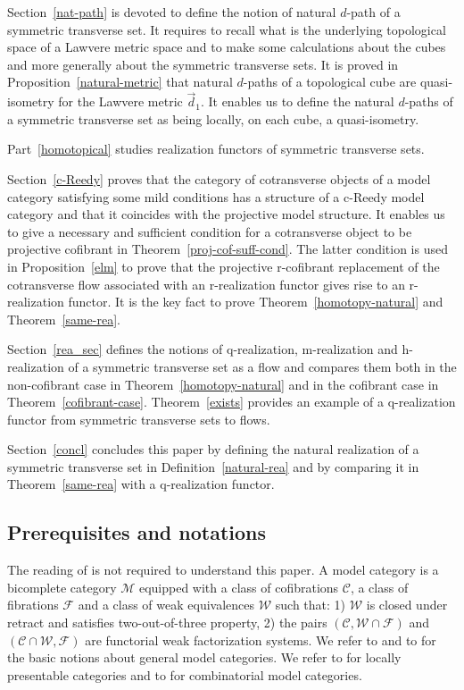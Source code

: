 \documentclass[a4paper,12pt]{amsart}
\newcommand{\C}{\mathcal{C}}
\newcommand{\W}{\mathcal{W}}
\newcommand{\F}{\mathcal{F}}
\renewcommand{\vec}{\overrightarrow}
\theoremstyle{definition}
\newcommand{\ttt}{two-out-of-three property}
\newcommand{\vd}{\vec{d}\!_1}
\begin{document}
Section~\ref{nat-path} is devoted to define the notion of natural $d$-path of a symmetric transverse set. It requires to recall what is the underlying topological space of a Lawvere metric space and to make some calculations about the cubes and more generally about the symmetric transverse sets. It is proved in Proposition~\ref{natural-metric} that natural $d$-paths of a topological cube are quasi-isometry for the Lawvere metric $\vd$. It enables us to define the natural $d$-paths of a symmetric transverse set as being locally, on each cube, a quasi-isometry. 

Part~\ref{homotopical} studies realization functors of symmetric transverse sets. 

Section~\ref{c-Reedy} proves that the category of cotransverse objects of a model category satisfying some mild conditions has a structure of a c-Reedy model category and that it coincides with the projective model structure. It enables us to give a necessary and sufficient condition for a cotransverse object to be projective cofibrant in Theorem~\ref{proj-cof-suff-cond}. The latter condition is used in Proposition~\ref{elm} to prove that the projective r-cofibrant replacement of the cotransverse flow associated with an r-realization functor gives rise to an r-realization functor. It is the key fact to prove Theorem~\ref{homotopy-natural} and Theorem~\ref{same-rea}. 

Section~\ref{rea_sec} defines the notions of q-realization, m-realization and h-realization of a symmetric transverse set as a flow and compares them both in the non-cofibrant case in Theorem~\ref{homotopy-natural} and in the cofibrant case in Theorem~\ref{cofibrant-case}. Theorem~\ref{exists} provides an example of a q-realization functor from symmetric transverse sets to flows. 

Section~\ref{concl} concludes this paper by defining the natural realization of a symmetric transverse set in Definition~\ref{natural-rea} and by comparing it in Theorem~\ref{same-rea} with a q-realization functor.

\subsection*{Prerequisites and notations}

The reading of \cite{NaturalRealization} is not required to understand this paper. A model category is a bicomplete category $\mathcal{M}$ equipped with a class of cofibrations $\C$, a class of fibrations $\F$ and a class of weak equivalences $\W$ such that: 1) $\W$ is closed under retract and satisfies \ttt, 2) the pairs $(\C,\W\cap \F)$ and $(\C\cap \W,\F)$ are functorial weak factorization systems. We refer to \cite[Chapter~1]{MR99h:55031} and to \cite[Chapter~7]{ref_model2} for the basic notions about general model categories. We refer to \cite{TheBook} for locally presentable categories and to \cite{MR2506258} for combinatorial model categories.
\end{document}
